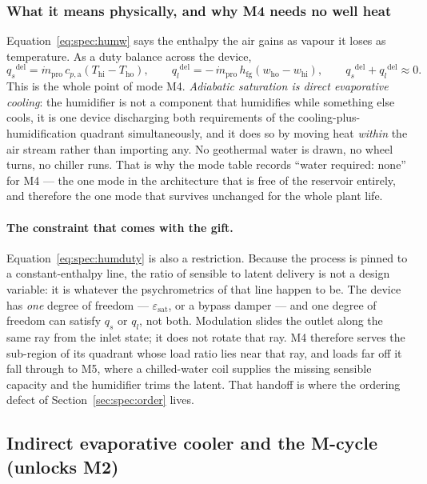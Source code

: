 \documentclass[11pt]{article}
\newcommand{\mdp}{\ensuremath{\dot m_{\mathrm{pro}}}}
\newcommand{\hfg}{\ensuremath{h_{\mathrm{fg}}}}
\newcommand{\qs}{\ensuremath{q_{s}}}
\newcommand{\ql}{\ensuremath{q_{l}}}
\begin{document}
\subsubsection{What it means physically, and why M4 needs no well heat}
Equation~\eqref{eq:spec:humw} says the enthalpy the air gains as vapour it loses as temperature. As a
duty balance across the device,
\begin{equation}
\qs^{\mathrm{del}} = \mdp\,c_{p,\mathrm{a}}\left(T_{\mathrm{hi}}-T_{\mathrm{ho}}\right),
\qquad
\ql^{\mathrm{del}} = -\,\mdp\,\hfg\left(w_{\mathrm{ho}}-w_{\mathrm{hi}}\right),
\qquad
\qs^{\mathrm{del}} + \ql^{\mathrm{del}} \approx 0 .
\label{eq:spec:humduty}
\end{equation}
This is the whole point of mode M4. \emph{Adiabatic saturation is direct evaporative cooling}: the
humidifier is not a component that humidifies while something else cools, it is one device
discharging both requirements of the cooling-plus-humidification quadrant simultaneously, and it does
so by moving heat \emph{within} the air stream rather than importing any. No geothermal water is
drawn, no wheel turns, no chiller runs. That is why the mode table records ``water required: none''
for M4 --- the one mode in the architecture that is free of the reservoir entirely, and therefore the
one mode that survives unchanged for the whole plant life.

\paragraph{The constraint that comes with the gift.} Equation~\eqref{eq:spec:humduty} is also a
restriction. Because the process is pinned to a constant-enthalpy line, the ratio of sensible to
latent delivery is not a design variable: it is whatever the psychrometrics of that line happen to
be. The device has \emph{one} degree of freedom --- $\varepsilon_{\mathrm{sat}}$, or a bypass damper
--- and one degree of freedom can satisfy $\qs$ or $\ql$, not both. Modulation slides the outlet
along the same ray from the inlet state; it does not rotate that ray. M4 therefore serves the
sub-region of its quadrant whose load ratio lies near that ray, and loads far off it fall through to
M5, where a chilled-water coil supplies the missing sensible capacity and the humidifier trims the
latent. That handoff is where the ordering defect of Section~\ref{sec:spec:order} lives.

\subsection{Indirect evaporative cooler and the M-cycle (unlocks M2)}
\label{sec:spec:iec}
\end{document}
